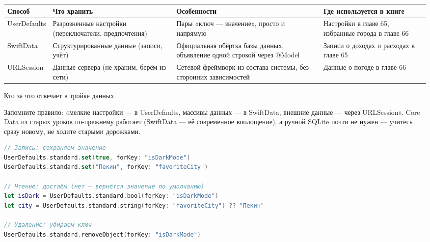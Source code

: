 


\begin{center}
\begin{tabularx}{\linewidth}{|X|X|X|X|}
\hline
\textbf{Способ} & \textbf{Что хранить} & \textbf{Особенности} & \textbf{Где используется в книге} \tabularnewline
\hline
UserDefaults & Разрозненные настройки (переключатели, предпочтения) & Пары «ключ — значение», просто и напрямую & Настройки в главе 65, избранные города в главе 66 \tabularnewline
SwiftData & Структурированные данные (записи, учёт) & Официальная обёртка базы данных, объявление одной строкой через @Model & Записи о доходах и расходах в главе 65 \tabularnewline
URLSession & Данные сервера (не храним, берём из сети) & Сетевой фреймворк из состава системы, без сторонних зависимостей & Данные о погоде в главе 66 \tabularnewline
\hline
\end{tabularx}
\end{center}

\begin{center}\small\color{gray}Кто за что отвечает в тройке данных\end{center}

Запомните правило: «мелкие настройки — в UserDefaults, массивы данных — в SwiftData, внешние данные — через URLSession». Core Data из старых уроков по-прежнему работает (SwiftData — её современное воплощение), а ручной SQLite почти не нужен — учитесь сразу новому, не ходите старыми дорожками.


\begin{lstlisting}[language=Swift]
// Запись: сохраняем значение
UserDefaults.standard.set(true, forKey: "isDarkMode")
UserDefaults.standard.set("Пекин", forKey: "favoriteCity")

// Чтение: достаём (нет — вернётся значение по умолчанию)
let isDark = UserDefaults.standard.bool(forKey: "isDarkMode")
let city = UserDefaults.standard.string(forKey: "favoriteCity") ?? "Пекин"

// Удаление: убираем ключ
UserDefaults.standard.removeObject(forKey: "isDarkMode")
\end{lstlisting}

